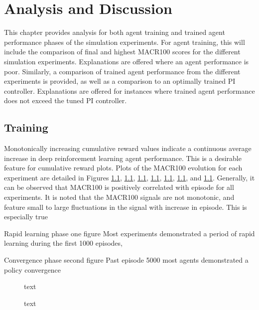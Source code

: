 \chapter{Analysis and Discussion}

This chapter provides analysis for both agent training and trained agent performance phases of the simulation experiments. For agent training, this will include the comparison of final and highest MACR100 scores for the different simulation experiments. Explanations are offered where an agent performance is poor. Similarly, a comparison of trained agent performance from the different experiments is provided, as well as a comparison to an optimally trained PI controller. Explanations are offered for instances where trained agent performance does not exceed the tuned PI controller.

\section{Training}
Monotonically increasing cumulative reward values indicate a continuous average increase in deep reinforcement learning agent performance. This is a desirable feature for cumulative reward plots. Plots of the MACR100 evolution for each experiment are detailed in Figures \ref{}, \ref{}, \ref{}, \ref{}, \ref{}, \ref{}, and \ref{}. Generally, it can be observed that MACR100 is positively correlated with episode for all experiments. It is noted that the MACR100 signals are not monotonic, and feature small to large fluctuations in the signal with increase in episode. This is especially true 


Rapid learning phase one figure
Most experiments demonstrated a period of rapid learning during the first 1000 episodes,


Convergence phase second figure
Past episode 5000 most agents demonstrated a policy convergence 

\clearpage

\begin{figure}[h]
	\centering
	
	
	\caption{text}
	
	\vspace{0.5cm}
	
	
	\caption{text}
\end{figure}

\clearpage

